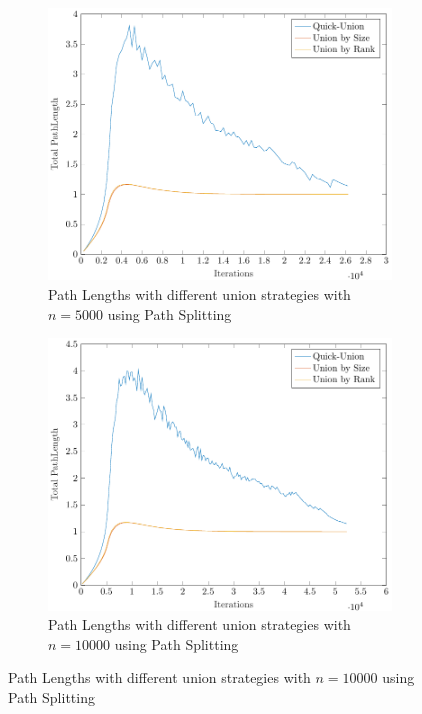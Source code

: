 \begin{figure}[ht]
\begin{subfigure}{0.32\textwidth}
    \end{subfigure}%
    \hfill
    \begin{subfigure}{0.32\textwidth}
        \centering
        \includegraphics[width=\textwidth]{../images/plotPSFull5000_PathLength.pdf}
        \caption{Path Lengths with different union strategies with $n = 5000$ using Path Splitting}
    \end{subfigure}%
    \hfill
    \begin{subfigure}{0.32\textwidth}
        \centering
        \includegraphics[width=\textwidth]{../images/plotPSFull10000_PathLength.pdf}
        \caption{Path Lengths with different union strategies with $n = 10000$ using Path Splitting}
    \end{subfigure}


\end{figure}
